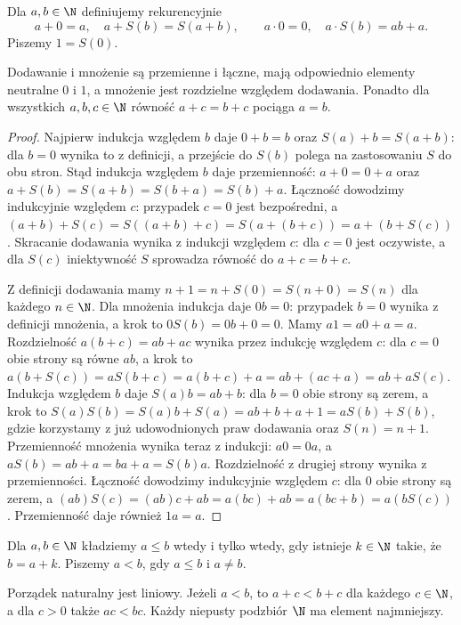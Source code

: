 \begin{definicja}[Działania]
\label{ma1:def:nat-operations}
Dla $a,b\in\N$ definiujemy rekurencyjnie
\[
a+0=a,\quad a+S(b)=S(a+b),\qquad
a\cdot0=0,\quad a\cdot S(b)=ab+a.
\]
Piszemy $1=S(0)$.
\end{definicja}
\begin{twierdzenie}
\label{ma1:thm:nat-laws}
Dodawanie i mnożenie są przemienne i łączne, mają odpowiednio elementy neutralne $0$ i $1$, a mnożenie jest rozdzielne względem dodawania. Ponadto dla wszystkich $a,b,c\in\N$ równość $a+c=b+c$ pociąga $a=b$.
\end{twierdzenie}
\begin{proof}
Najpierw indukcja względem $b$ daje $0+b=b$ oraz $S(a)+b=S(a+b)$: dla $b=0$ wynika to z definicji, a przejście do $S(b)$ polega na zastosowaniu $S$ do obu stron. Stąd indukcja względem $b$ daje przemienność: $a+0=0+a$ oraz $a+S(b)=S(a+b)=S(b+a)=S(b)+a$. Łączność dowodzimy indukcyjnie względem $c$: przypadek $c=0$ jest bezpośredni, a
$(a+b)+S(c)=S((a+b)+c)=S(a+(b+c))=a+(b+S(c))$.
Skracanie dodawania wynika z indukcji względem $c$: dla $c=0$ jest oczywiste, a dla $S(c)$ iniektywność $S$ sprowadza równość do $a+c=b+c$.

Z definicji dodawania mamy $n+1=n+S(0)=S(n+0)=S(n)$ dla każdego $n\in\N$. Dla mnożenia indukcja daje $0b=0$: przypadek $b=0$ wynika z definicji mnożenia, a krok to $0S(b)=0b+0=0$. Mamy $a1=a0+a=a$. Rozdzielność $a(b+c)=ab+ac$ wynika przez indukcję względem $c$: dla $c=0$ obie strony są równe $ab$, a krok to
$a(b+S(c))=aS(b+c)=a(b+c)+a=ab+(ac+a)=ab+aS(c)$.
Indukcja względem $b$ daje $S(a)b=ab+b$: dla $b=0$ obie strony są zerem, a krok to
$S(a)S(b)=S(a)b+S(a)=ab+b+a+1=aS(b)+S(b)$,
gdzie korzystamy z już udowodnionych praw dodawania oraz $S(n)=n+1$.
Przemienność mnożenia wynika teraz z indukcji: $a0=0a$, a
$aS(b)=ab+a=ba+a=S(b)a$. Rozdzielność z drugiej strony wynika z przemienności. Łączność dowodzimy indukcyjnie względem $c$: dla $0$ obie strony są zerem, a
$(ab)S(c)=(ab)c+ab=a(bc)+ab=a(bc+b)=a(bS(c))$.
Przemienność daje również $1a=a$.
\end{proof}
\begin{definicja}
Dla $a,b\in\N$ kładziemy $a\le b$ wtedy i tylko wtedy, gdy istnieje $k\in\N$ takie, że $b=a+k$. Piszemy $a<b$, gdy $a\le b$ i $a\ne b$.
\end{definicja}
\begin{twierdzenie}
\label{ma1:thm:nat-order}
Porządek naturalny jest liniowy. Jeżeli $a<b$, to $a+c<b+c$ dla każdego $c\in\N$, a dla $c>0$ także $ac<bc$. Każdy niepusty podzbiór $\N$ ma element najmniejszy.
\end{twierdzenie}
